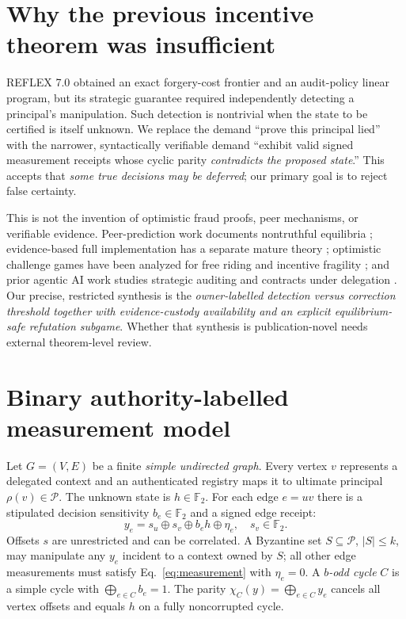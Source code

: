 \documentclass[10pt,a4paper]{article}
\newcommand{\F}{\mathbb F_2}
\newcommand{\Pset}{\mathcal P}
\newcommand{\xor}{\mathbin\oplus}
\begin{document}
\section{Why the previous incentive theorem was insufficient}
REFLEX 7.0 obtained an exact forgery-cost frontier and an audit-policy linear program, but its strategic guarantee required independently detecting a principal's manipulation. Such detection is nontrivial when the state to be certified is itself unknown. We replace the demand ``prove this principal lied'' with the narrower, syntactically verifiable demand ``exhibit valid signed measurement receipts whose cyclic parity \emph{contradicts the proposed state}.'' This accepts that \emph{some true decisions may be deferred}; our primary goal is to reject false certainty.

This is not the invention of optimistic fraud proofs, peer mechanisms, or verifiable evidence. Peer-prediction work documents nontruthful equilibria \cite{kong2018,lehmann2025}; evidence-based full implementation has a separate mature theory \cite{banerjee2024,robust2026}; optimistic challenge games have been analyzed for free riding and incentive fragility \cite{incentive2026}; and prior agentic AI work studies strategic auditing \cite{das2026} and contracts under delegation \cite{davoust2020}. Our precise, restricted synthesis is the \emph{owner-labelled detection versus correction threshold together with evidence-custody availability and an explicit equilibrium-safe refutation subgame}. Whether that synthesis is publication-novel needs external theorem-level review.

\section{Binary authority-labelled measurement model}
Let $G=(V,E)$ be a finite \emph{simple undirected graph}. Every vertex $v$ represents a delegated context and an authenticated registry maps it to ultimate principal $\rho(v)\in\Pset$. The unknown state is $h\in\F$. For each edge $e=uv$ there is a stipulated decision sensitivity $b_e\in\F$ and a signed edge receipt:
\begin{equation}\label{eq:measurement}
 y_e=s_u\xor s_v\xor b_eh\xor\eta_e,\quad s_v\in\F.
\end{equation}
Offsets $s$ are unrestricted and can be correlated. A Byzantine set $S\subseteq\Pset$, $|S|\le k$, may manipulate any $y_e$ incident to a context owned by $S$; all other edge measurements must satisfy Eq.~\eqref{eq:measurement} with $\eta_e=0$. A \emph{$b$-odd cycle} $C$ is a simple cycle with $\bigoplus_{e\in C}b_e=1$. The parity $\chi_C(y)=\bigoplus_{e\in C} y_e$ cancels all vertex offsets and equals $h$ on a fully noncorrupted cycle.
\end{document}

